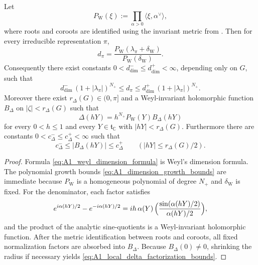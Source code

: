 \begin{lemma}\label{lem:A1_weyl_dimension_denominator}
Let
\[
P_{\mathrm W}(\xi):=\prod_{\alpha>0}\langle \xi,\alpha^\vee\rangle,
\]
where roots and coroots are identified using the invariant metric from .
Then for every irreducible representation $\pi$,
\begin{equation}\label{eq:A1_weyl_dimension_formula}
d_\pi=\frac{P_{\mathrm W}(\lambda_\pi+\delta_{\mathrm W})}{P_{\mathrm W}(\delta_{\mathrm W})}.
\end{equation}
Consequently there exist constants $0<d_{\dim}^-\le d_{\dim}^+<\infty$, depending only on $G$, such that
\begin{equation}\label{eq:A1_dimension_growth_bounds}
d_{\dim}^-\,(1+|\lambda_\pi|)^{N_+}
\le d_\pi\le
d_{\dim}^+\,(1+|\lambda_\pi|)^{N_+}.
\end{equation}
Moreover there exist $r_\Delta(G)\in(0,\pi]$ and a Weyl-invariant holomorphic function $B_\Delta$ on $|\zeta|<r_\Delta(G)$ such that
\begin{equation}\label{eq:A1_local_delta_factorization}
\Delta(hY)
=
h^{N_+}P_{\mathrm W}(Y)B_\Delta(hY)
\end{equation}
for every $0<h\le 1$ and every $Y\in \mathfrak t_\mathbb C$ with $|hY|<r_\Delta(G)$.
Furthermore there are constants $0<c_\Delta^-\le c_\Delta^+<\infty$ such that
\begin{equation}\label{eq:A1_local_delta_factorization_bounds}
c_\Delta^-\le |B_\Delta(hY)|\le c_\Delta^+
\qquad (|hY|\le r_\Delta(G)/2).
\end{equation}
\end{lemma}

\begin{proof}
Formula \eqref{eq:A1_weyl_dimension_formula} is Weyl's dimension formula.
The polynomial growth bounds \eqref{eq:A1_dimension_growth_bounds} are immediate because $P_{\mathrm W}$ is a homogeneous polynomial of degree $N_+$ and $\delta_{\mathrm W}$ is fixed.
For the denominator, each factor satisfies
\[
e^{i\alpha(hY)/2}-e^{-i\alpha(hY)/2}
=
ih\,\alpha(Y)\,\Bigl(\frac{\sin(\alpha(hY)/2)}{\alpha(hY)/2}\Bigr),
\]
and the product of the analytic sine-quotients is a Weyl-invariant holomorphic function.
After the metric identification between roots and coroots, all fixed normalization factors are absorbed into $B_\Delta$.
Because $B_\Delta(0)\neq 0$, shrinking the radius if necessary yields \eqref{eq:A1_local_delta_factorization_bounds}.
\end{proof}

